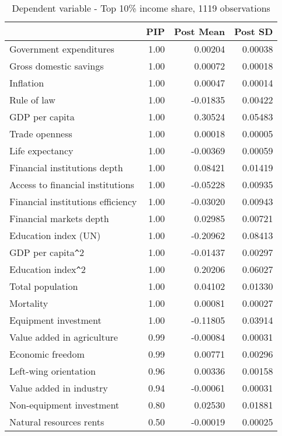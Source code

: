 \documentclass[a4paper,11pt]{article}
\begin{document}
\begin{table}[!ht]
    \footnotesize
    \centering
    \caption{Dependent variable - Top 10\% income share, 1119 observations}
    \label{table:gini1y}
    \begin{tabular}{lrrr}
      \toprule
      & PIP & Post Mean & Post SD \\
      \hline
      Government expenditures & 1.00 & 0.00204 & 0.00038 \\
      Gross domestic savings & 1.00 & 0.00072 & 0.00018 \\
      Inflation & 1.00 & 0.00047 & 0.00014 \\
      Rule of law & 1.00 & -0.01835 & 0.00422 \\
      GDP per capita & 1.00 & 0.30524 & 0.05483 \\
      Trade openness & 1.00 & 0.00018 & 0.00005 \\
      Life expectancy & 1.00 & -0.00369 & 0.00059 \\
      Financial institutions depth & 1.00 & 0.08421 & 0.01419 \\
      Access to financial institutions & 1.00 & -0.05228 & 0.00935 \\
      Financial institutions efficiency & 1.00 & -0.03020 & 0.00943 \\
      Financial markets depth & 1.00 & 0.02985 & 0.00721 \\
      Education index (UN) & 1.00 & -0.20962 & 0.08413 \\
      GDP per capita\verb|^|2 & 1.00 & -0.01437 & 0.00297 \\
      Education index\verb|^|2 & 1.00 & 0.20206 & 0.06027 \\
      Total population & 1.00 & 0.04102 & 0.01330 \\
      Mortality & 1.00 & 0.00081 & 0.00027 \\
      Equipment investment & 1.00 & -0.11805 & 0.03914 \\
      Value added in agriculture & 0.99 & -0.00084 & 0.00031 \\
      Economic freedom & 0.99 & 0.00771 & 0.00296 \\
      Left-wing orientation & 0.96 & 0.00336 & 0.00158 \\
      Value added in industry & 0.94 & -0.00061 & 0.00031 \\
      Non-equipment investment & 0.80 & 0.02530 & 0.01881 \\
      Natural resources rents & 0.50 & -0.00019 & 0.00025 \\

\end{tabular}
\end{table}
\end{document}
